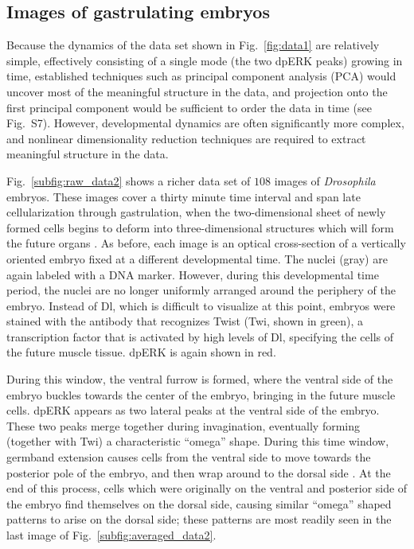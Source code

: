 \documentclass{pnastwo}
\newcommand{\fig}[0]{Fig.}
\begin{document}
\begin{article}
%

\subsection{Images of gastrulating embryos}

%
Because the dynamics of the data set shown in \fig~\ref{fig:data1} are relatively simple, effectively consisting of a single mode (the two dpERK peaks) growing in time, established techniques such as principal component analysis (PCA) \cite{shlens2005tutorial} would uncover most of the meaningful structure in the data, and projection onto the first principal component would be sufficient to order the data in time (see \fig~S7).
%
However, developmental dynamics are often significantly more complex, and nonlinear dimensionality reduction techniques are required to extract meaningful structure in the data.
%

\fig~\ref{subfig:raw_data2} shows a richer data set of $108$ images of {\it Drosophila} embryos.
%
These images cover a thirty minute time interval and span late cellularization through gastrulation, when the two-dimensional sheet of newly formed cells begins to deform into three-dimensional structures which will form the future organs \cite{leptin2005gastrulation}.
%
As before, each image is an optical cross-section of a vertically oriented embryo fixed at a different developmental time.
%
The nuclei (gray) are again labeled with a DNA marker.
%
However, during this developmental time period, the nuclei are no longer uniformly arranged around the periphery of the embryo.
%
Instead of Dl, which is difficult to visualize at this point, embryos were stained with the antibody that recognizes Twist (Twi, shown in green), a transcription factor that is activated by high levels of Dl, specifying the cells of the future muscle tissue.
%
dpERK is again shown in red.

%
During this window, the ventral furrow is formed, where the ventral side of the embryo buckles towards the center of the embryo, bringing in the future muscle cells.
%
dpERK appears as two lateral peaks at the ventral side of the embryo.
%
These two peaks merge together during invagination, eventually forming (together with Twi) a characteristic ``omega'' shape.
%
During this time window, germband extension causes cells from the ventral side to move towards the posterior pole of the embryo, and then wrap around to the dorsal side \cite{leptin2005gastrulation}.
%
At the end of this process, cells which were originally on the ventral and posterior side of the embryo find themselves on the dorsal side, causing similar ``omega'' shaped patterns to arise on the dorsal side; these patterns are most readily seen in the last image of \fig~\ref{subfig:averaged_data2}.


\end{article}
\end{document}
